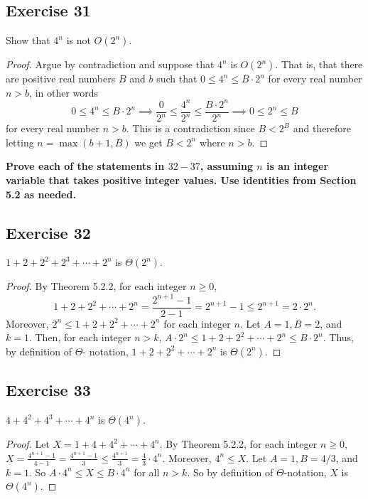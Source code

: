 \documentclass[14pt]{extarticle}
\newcommand{\dps}{\displaystyle}
\newcommand{\cy}{\color{cyan}}
\begin{document}
\subsection{Exercise 31}
Show that \(4^n\) is not \(O(2^n)\).

\begin{proof}
    Argue by contradiction and suppose that \(4^n\) is \(O(2^n)\). That is, that there are positive real numbers \(B\) and \(b\)
    such that \(0 \leq 4^n \leq B \cdot 2^n\) for every real number \(n > b\), in other words
    \[
        0 \leq 4^n \leq B \cdot 2^n \implies \frac{0}{2^n} \leq \frac{4^n}{2^n} \leq \frac{B \cdot 2^n}{2^n} \implies 0 \leq
        2^n \leq B
    \]
    for every real number \(n > b\). This is a contradiction since \(B < 2^B\) and therefore letting \(n = \max(b+1, B)\) we get
    \(B < 2^n\) where \(n > b\).
\end{proof}

{\bf \cy Prove each of the statements in \(32-37\), assuming \(n\) is an integer variable that takes positive integer
values. Use identities from Section 5.2 as needed.}

\subsection{Exercise 32}
\(1 + 2 + 2^2 + 2^3 + \cdots + 2^n\) is \(\Theta(2^n)\).
\begin{proof}
    By Theorem 5.2.2, for each integer \(n \geq 0\),
    \[
        1+2+2^2 + \cdots + 2^n = \frac{2^{n+1} - 1}{2-1} = 2^{n+1} - 1 \leq 2^{n+1} = 2 \cdot 2^n.
    \]
    Moreover, \(2^n \leq 1+2+2^2 + \cdots + 2^n\) for each integer \(n\). Let \(A = 1, B = 2\), and \(k = 1\). Then, for each
    integer \(n > k\), \(A \cdot 2^n \leq 1 + 2 + 2^2 + \cdots + 2^n \leq B \cdot 2^n\). Thus, by definition of \(\Theta\)-
    notation, \(1 + 2 + 2^2 + \cdots + 2^n\) is \(\Theta(2^n)\).
\end{proof}

\subsection{Exercise 33}
\(4 + 4^2 + 4^3 + \cdots + 4^n\) is \(\Theta(4^n)\).
\begin{proof}
    Let \(X = 1 + 4 + 4^2 + \cdots + 4^n\). By Theorem 5.2.2, for each integer \(n \geq 0\), \(\dps X = \frac{4^{n+1} - 1}{4-1}
    = \frac{4^{n+1} - 1}{3} \leq \frac{4^{n+1}}{3} = \frac{4}{3}\cdot 4^n\). Moreover, \(4^n \leq X\). Let \(A = 1, B = 4/3\),
    and \(k = 1\). So \(A \cdot 4^n \leq X \leq B \cdot 4^n\) for all \(n > k\). So by definition of \(\Theta\)-notation, \(X\)
    is \(\Theta(4^n)\).
\end{proof}
\end{document}
